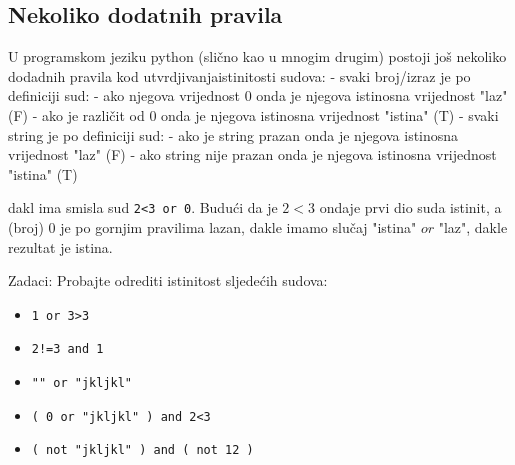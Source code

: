 \subsection{Nekoliko dodatnih pravila}

U programskom jeziku python (slično kao u mnogim drugim) postoji
još nekoliko dodadnih pravila kod utvrdjivanjaistinitosti sudova:
- svaki broj/izraz je po definiciji sud:
	- ako njegova vrijednost 0 onda je njegova istinosna vrijednost "laz" (F)
	- ako je različit od 0 onda je njegova istinosna vrijednost "istina" (T)
- svaki string je po definiciji sud:
	- ako je string prazan onda je njegova istinosna vrijednost "laz" (F)
	- ako string nije prazan onda je njegova istinosna vrijednost "istina" (T)

dakl ima smisla sud \verb"2<3 or 0". Budući da je $2<3$ ondaje prvi dio suda istinit, a (broj) 0 je
po gornjim pravilima lazan, dakle imamo slučaj "istina" $or$ "laz", dakle rezultat je istina.

Zadaci: Probajte odrediti istinitost sljedećih sudova:
\begin{itemize}
\item \verb"1 or 3>3"
\item \verb"2!=3 and 1"
\item \verb+"" or "jkljkl"+
\item \verb+( 0 or "jkljkl" ) and 2<3+
\item \verb+( not "jkljkl" ) and ( not 12 )+
\end{itemize}
